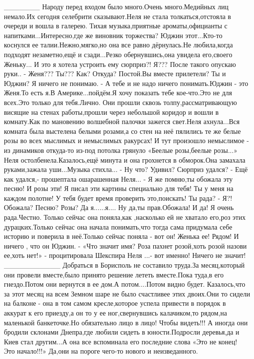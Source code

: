 _______
Народу перед входом было много.Очень много.Медийных лиц немало.Их сегодня селебрити сказывают.Неля не стала толкаться,отстояла в очереди и вошла в галерею.
Тихая музыка,приятные ароматы,официанты с напитками...Интересно,где же виновник торжества? Юджин этот...Кто-то коснулся ее талии.Нежно,мягко,но она все равно дёрнулась.Не любила,когда подходят незаметно,ещё и сзади...Резко обернувшись,она увидела его,своего Женьку...
И это я хотела устроить ему сюрприз?! Я??? После такого опускаю руки..
- Женя??? Ты??? Как? Откуда? Постой.Вы вместе прилетели? Ты и Юджин? Я ничего не понимаю.
- А тебе и не надо ничего понимать.Юджин - это Женя.То есть я.В Америке...пойдём.Я хочу показать тебе кое-что.Это не для всех.Это только для тебя.Лично.
Они прошли сквозь толпу,рассматривающую висящие на стенах работы,прошли через небольшой коридор и вошли в комнату.Как по мановению волшебной палочки зажегся свет.Неля ахнула...Вся комната была выстелена белыми розами,а со стен на неё пялились те же белые розы во всех мыслимых и немыслимых ракурсах! И тут произошло немыслимое - из динамиков откуда-то из-под потолка грянуло «Беелые розы,беелые розы...» Неля остолбенела.Казалось,ещё минута и она грохнется в обморок.Она замахала руками,зажала уши...Музыка стихла...
- Ну что? Удивил? Сюрприз удался?
- Ещё как удался,- прошептала ошарашенная Неля...
- Я же помню,ты обожала эту песню! И розы эти! Я писал эти картины специально для тебя! Ты у меня на каждом полотне! У тебя будет время проверить это,поискать! Ты рада? 
- Я?! Обожала? Песню? Розы? Да я......я.... Ну да,ты прав.Обожала! И да! Я очень рада.Честно.
Только сейчас она поняла,как ,насколько ей не хватало его,роз этих дурацких.Только сейчас она начала понимать,что тогда сама придумала себе историю и поверила в неё.Только сейчас поняла - вот он! Женька ее! Рядом! И ничего , что он Юджин. 
- «Что значит имя? Роза пахнет розой,хоть розой назови ее,хоть нет!» - процитировала Шекспира Неля ...- вот именно! Ничего не значит! 
___________
Добраться в Борисполь не составило труда.За месяц,который они провели вместе,было принято решение лететь вместе.Пока туда,в его гнездо.Потом они вернутся в ее дом.А потом....Потом видно будет.
Казалось,что за этот месяц на всем Земном шаре не было счастливее этих двоих.Они то сидели на балконе - она в том самом кресле,которое успела привести в порядок в аккурат к его приезду,а он то у ее ног,свернувшись калачиком,то рядом,на маленькой банкеточке.Но обязательно лицо в лицо! Чтобы видеть!!! 
А иногда они бродили склонами Днепра,где любили сидеть в юности.Подросли деревья,да и Киев стал другим...А она все вспоминала его последние слова «Это не конец! Это начало!!!» Да,они на пороге чего-то нового и неизведанного.
